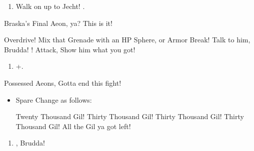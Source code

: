 \begin{enumerate}[resume]
\item Walk on up to Jecht! \cs[4:30].
\end{enumerate}
\begin{battle}[180000]{Braska's Final Aeon, ya? This is it!}
\begin{itemize}
\switch{\yuna}{\rikku}
\rikkuf Overdrive! Mix that Grenade with an HP Sphere, or Armor Break!
\tidusf Talk to him, Brudda!
\switch{\auron}{\yuna}
\summon{\bahamut}!
\bahamutf Attack, Show him what you got!
\end{itemize}
\end{battle}
\begin{enumerate}[resume]
\item \cs+\skippablefmv[4:00].
\end{enumerate}
\begin{battle}{Possessed Aeons, Gotta end this fight!}
\begin{itemize}
\item Spare Change as follows:
\begin{itemize}
\valeforf Twenty Thousand Gil!
\ifritf Thirty Thousand Gil!
\ixionf Thirty Thousand Gil!
\shivaf Thirty Thousand Gil!
\bahamutf All the Gil ya got left!
\end{itemize}
\end{itemize}
\end{battle}
\begin{enumerate}[resume]
\item \cs[1:40], Brudda!
\end{enumerate}
\colend
